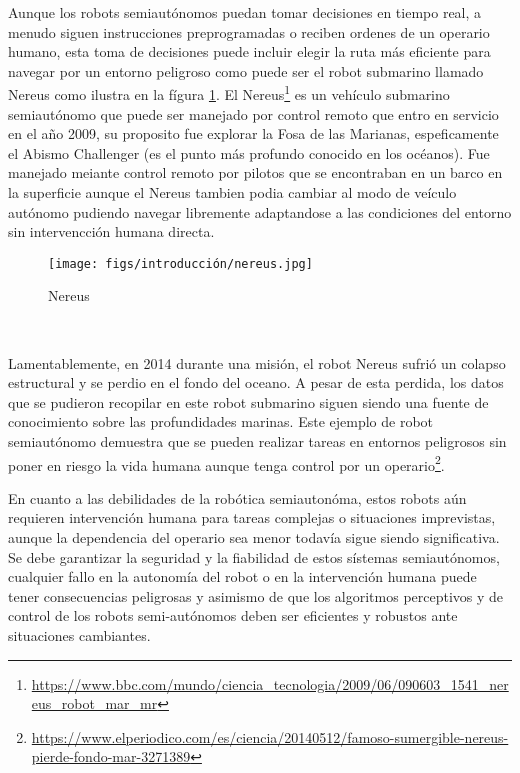 Aunque los robots semiautónomos puedan tomar decisiones en tiempo real, a menudo siguen instrucciones preprogramadas o reciben ordenes de un operario humano, esta toma de decisiones
puede incluir elegir la ruta más eficiente para navegar por un entorno peligroso como puede ser el robot submarino llamado Nereus como ilustra en la fígura \ref{fig:Nereus}. El Nereus\footnote{\url{https://www.bbc.com/mundo/ciencia_tecnologia/2009/06/090603_1541_nereus_robot_mar_mr}} 
es un vehículo submarino semiautónomo que puede ser manejado por control remoto que entro en servicio en el año 2009, su proposito fue explorar la Fosa de las Marianas, espeficamente el Abismo Challenger (es el punto más
profundo conocido en los océanos). Fue manejado meiante control remoto por pilotos que se encontraban en un barco en la superficie aunque el Nereus tambien podia cambiar al modo
de veículo autónomo pudiendo navegar libremente adaptandose a las condiciones del entorno sin intervencción humana directa. \newline

\begin{figure} [H]
  \begin{center}
    \texttt{[image: figs/introducción/nereus.jpg]}
  \end{center}
  \caption{Nereus}
  \label{fig:Nereus}
\end{figure}\

Lamentablemente, en 2014 durante una misión, el robot Nereus sufrió un colapso estructural y se perdio en el fondo del oceano. A pesar de esta perdida, los datos que se pudieron
recopilar en este robot submarino siguen siendo una fuente de conocimiento sobre las profundidades marinas. Este ejemplo de robot semiautónomo demuestra que se pueden realizar 
tareas en entornos peligrosos sin poner en riesgo la vida humana aunque tenga control por un operario\footnote{\url{https://www.elperiodico.com/es/ciencia/20140512/famoso-sumergible-nereus-pierde-fondo-mar-3271389}}. 

En cuanto a las debilidades de la robótica semiautonóma, estos robots 
aún requieren intervención humana para tareas complejas o situaciones imprevistas, aunque la dependencia del operario sea menor todavía sigue siendo significativa. 
Se debe garantizar la seguridad y la fiabilidad de estos sístemas semiautónomos, cualquier fallo en la autonomía del robot 
o en la intervención humana puede tener consecuencias peligrosas y asimismo de que los algoritmos perceptivos y de control de los robots semi-autónomos deben ser eficientes y 
robustos ante situaciones cambiantes.

